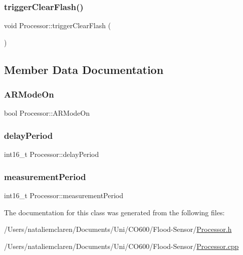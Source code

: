 \mbox{\label{class_processor_a8083069e032fcd6e38c97cc31475200a}} 
\subsubsection{\texorpdfstring{trigger\+Clear\+Flash()}{triggerClearFlash()}}
{\footnotesize\ttfamily void Processor\+::trigger\+Clear\+Flash (\begin{DoxyParamCaption}{ }\end{DoxyParamCaption})}



\subsection{Member Data Documentation}
\mbox{\label{class_processor_af51b6b3ce7074068195b5d3eb2442fdb}} 
\subsubsection{\texorpdfstring{A\+R\+Mode\+On}{ARModeOn}}
{\footnotesize\ttfamily bool Processor\+::\+A\+R\+Mode\+On}

\mbox{\label{class_processor_acfaad87bb46ff80f1b7966624542e6ef}} 
\subsubsection{\texorpdfstring{delay\+Period}{delayPeriod}}
{\footnotesize\ttfamily int16\+\_\+t Processor\+::delay\+Period}

\mbox{\label{class_processor_a5cb8792cf0882b5466eea2b8e0816684}} 
\subsubsection{\texorpdfstring{measurement\+Period}{measurementPeriod}}
{\footnotesize\ttfamily int16\+\_\+t Processor\+::measurement\+Period}



The documentation for this class was generated from the following files\+:\begin{DoxyCompactItemize}
\item 
/\+Users/nataliemclaren/\+Documents/\+Uni/\+C\+O600/\+Flood-\/\+Sensor/\mbox{\hyperlink{_processor_8h}{Processor.\+h}}\item 
/\+Users/nataliemclaren/\+Documents/\+Uni/\+C\+O600/\+Flood-\/\+Sensor/\mbox{\hyperlink{_processor_8cpp}{Processor.\+cpp}}\end{DoxyCompactItemize}
